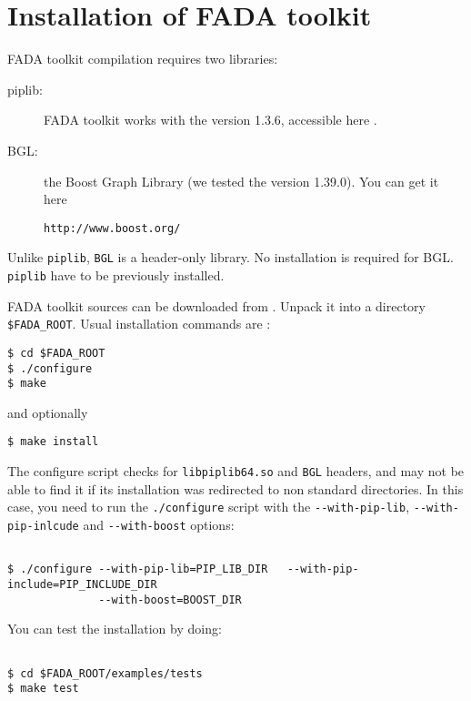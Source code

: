\section{Installation of FADA toolkit}
FADA toolkit compilation requires two libraries:
\begin{description}
 \item[piplib:] FADA toolkit works with the version 1.3.6, accessible here  \cite{piplib_website}.
 \item[BGL:] the Boost Graph Library (we tested the version 1.39.0). You can get it here \begin{footnotesize}\verb|http://www.boost.org/| \end{footnotesize}
 \end{description}
Unlike \verb|piplib|, \verb|BGL| is a header-only library. No installation is required for BGL. \verb|piplib| have to be previously installed.

FADA toolkit sources can be downloaded from \cite{fadalib_website}. Unpack it into a directory \verb|$FADA_ROOT|. Usual installation commands are :
\begin{verbatim}
$ cd $FADA_ROOT
$ ./configure
$ make
\end{verbatim}

and optionally 

\begin{verbatim}
$ make install
\end{verbatim}


The configure script checks for \verb|libpiplib64.so| and \verb|BGL| headers, and may not be able to find it if its installation was redirected to non standard directories. In this case, you need to run the \verb|./configure| script with the \verb|--with-pip-lib|, \verb|--with-pip-inlcude| and \verb|--with-boost|  options:

\begin{footnotesize}
\begin{verbatim}

$ ./configure --with-pip-lib=PIP_LIB_DIR   --with-pip-include=PIP_INCLUDE_DIR
              --with-boost=BOOST_DIR

\end{verbatim}
\end{footnotesize}

You can test the installation by doing:

\begin{verbatim}

$ cd $FADA_ROOT/examples/tests
$ make test

\end{verbatim}

